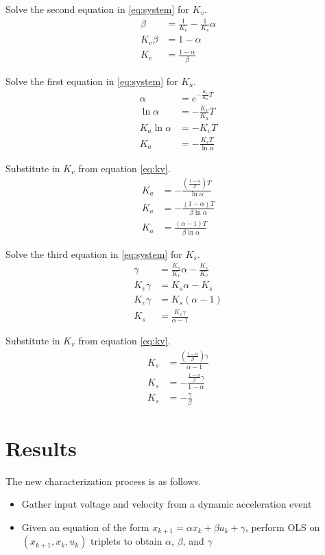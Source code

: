 \documentclass[10pt,conference,compsoc]{IEEEtran}
\begin{document}
Solve the second equation in \eqref{eq:system} for $K_v$.
\begin{align}
  \beta &= \frac{1}{K_v} - \frac{1}{K_v}\alpha \nonumber \\
  K_v \beta &= 1 - \alpha \nonumber \\
  K_v &= \frac{1 - \alpha}{\beta} \label{eq:kv}
\end{align}

Solve the first equation in \eqref{eq:system} for $K_a$.
\begin{align*}
  \alpha &= e^{-\frac{K_v}{K_a} T} \\
  \ln\alpha &= -\frac{K_v}{K_a} T \\
  K_a \ln\alpha &= -K_v T \\
  K_a &= -\frac{K_v T}{\ln\alpha}
\end{align*}

Substitute in $K_v$ from equation \eqref{eq:kv}.
\begin{align}
  K_a &= -\frac{\left(\frac{1 - \alpha}{\beta}\right) T}{\ln\alpha} \nonumber \\
  K_a &= -\frac{(1 - \alpha) T}{\beta \ln\alpha} \nonumber \\
  K_a &= \frac{(\alpha - 1) T}{\beta \ln\alpha}
\end{align}

Solve the third equation in \eqref{eq:system} for $K_s$.
\begin{align*}
  \gamma &= \frac{K_s}{K_v} \alpha - \frac{K_s}{K_v} \\
  K_v \gamma &= K_s \alpha - K_s \\
  K_v \gamma &= K_s(\alpha - 1) \\
  K_s &= \frac{K_v \gamma}{\alpha - 1}
\end{align*}

Substitute in $K_v$ from equation \eqref{eq:kv}.
\begin{align}
  K_s &= \frac{\left(\frac{1 - \alpha}{\beta}\right) \gamma}{\alpha - 1}
    \nonumber \\
  K_s &= -\frac{\frac{1 - \alpha}{\beta} \gamma}{1 - \alpha}
    \nonumber \\
  K_s &= -\frac{\gamma}{\beta}
\end{align}

\section{Results}

The new characterization process is as follows.
\begin{itemize}
  \item Gather input voltage and velocity from a dynamic acceleration event
  \item Given an equation of the form
    $x_{k+1} = \alpha x_k + \beta u_k + \gamma$, perform OLS on
    $(x_{k+1}, x_k, u_k)$ triplets to obtain $\alpha$, $\beta$, and $\gamma$
\end{itemize}
\end{document}
